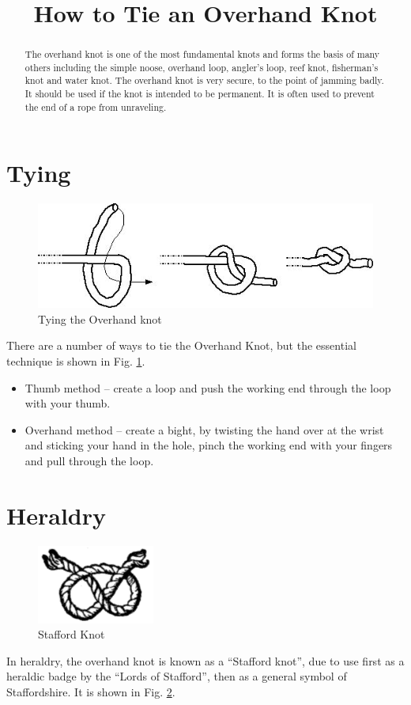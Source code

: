 \documentclass[a4paper,12pt]{article}
\title{How to Tie an Overhand Knot}
\author{}
\begin{document}
\maketitle 
\begin{abstract}
The overhand knot is one of the most fundamental knots and 
forms the basis of many others including the simple noose, overhand loop, 
angler's loop, reef knot, fisherman's knot and water knot. The overhand knot is 
very secure, to the point of jamming badly. It should be used if the knot is 
intended to be permanent. It is often used to prevent the end of a rope from 
unraveling. 
\end{abstract}

\section{Tying}

\begin{figure}[ht]
 \centering
 \includegraphics[scale=0.5]{tying.png}
 \caption{Tying the Overhand knot}\label{fig:overhand}
\end{figure}
There are a number of ways to tie the Overhand Knot, but the essential 
technique is shown in Fig. \ref{fig:overhand}.
\begin{itemize}
 \item Thumb method \--- create a loop and push the working end through the 
loop with your thumb.
 \item Overhand method \--- create a bight, by twisting the hand over at the 
wrist and sticking your hand in the hole, pinch the working end with your 
fingers and pull through the loop.
\end{itemize}

\section{Heraldry}

\begin{figure}[ht]
 \centering
 \includegraphics[scale=1]{heraldry.png}
 \caption{Stafford Knot}\label{fig:heraldry}
\end{figure}
In heraldry, the overhand knot is known as a ``Stafford knot'', 
due to use first as a heraldic badge by the 
``Lords of Stafford'', then as a general 
symbol of Staffordshire.\cite{heraldry} 
It is shown in Fig. \ref{fig:heraldry}.
\end{document}

